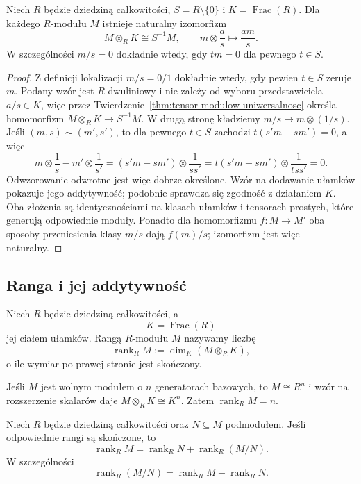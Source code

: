 \begin{stwierdzenie}
\label{prop:tensor-cialo-ulamkow}
Niech $R$ będzie dziedziną całkowitości,
$S=R\setminus\{0\}$ i $K=\operatorname{Frac}(R)$.
Dla każdego $R$-modułu $M$ istnieje naturalny izomorfizm
\[
M\otimes_R K\cong S^{-1}M,
\qquad m\otimes\frac{a}{s}\longmapsto\frac{am}{s}.
\]
W szczególności $m/s=0$ dokładnie wtedy, gdy
$tm=0$ dla pewnego $t\in S$.
\end{stwierdzenie}
\begin{proof}
Z definicji lokalizacji
$m/s=0/1$ dokładnie wtedy, gdy pewien $t\in S$
zeruje $m$. Podany wzór jest $R$-dwuliniowy i nie zależy
od wyboru przedstawiciela $a/s\in K$, więc przez
Twierdzenie~\ref{thm:tensor-modulow-uniwersalnosc}
określa homomorfizm $M\otimes_R K\to S^{-1}M$.
W drugą stronę kładziemy $m/s\mapsto m\otimes(1/s)$.
Jeśli $(m,s)\sim(m',s')$, to dla pewnego $t\in S$
zachodzi $t(s'm-sm')=0$, a więc
\[
m\otimes\frac1s-m'\otimes\frac1{s'}
=(s'm-sm')\otimes\frac1{ss'}
=t(s'm-sm')\otimes\frac1{tss'}=0.
\]
Odwzorowanie odwrotne jest więc dobrze określone.
Wzór na dodawanie ułamków pokazuje jego addytywność;
podobnie sprawdza się zgodność z działaniem $K$.
Oba złożenia są identycznościami na klasach ułamków
i tensorach prostych, które generują odpowiednie moduły.
Ponadto dla homomorfizmu $f:M\to M'$ oba sposoby
przeniesienia klasy $m/s$ dają $f(m)/s$;
izomorfizm jest więc naturalny.
\end{proof}

\subsection*{Ranga i jej addytywność}

\begin{definicja}
\label{def:ranga-modulu}
Niech $R$ będzie dziedziną całkowitości, a
\[
K=\operatorname{Frac}(R)
\]
jej ciałem ułamków. Rangą $R$-modułu $M$ nazywamy liczbę
\[
\operatorname{rank}_R M
:=
\dim_K(M\otimes_R K),
\]
o ile wymiar po prawej stronie jest skończony.
\end{definicja}

Jeśli $M$ jest wolnym modułem o $n$ generatorach bazowych, to
$M\cong R^n$ i wzór na rozszerzenie skalarów daje
$M\otimes_R K\cong K^n$. Zatem $\operatorname{rank}_R M=n$.

\begin{stwierdzenie}
\label{prop:ranga-ilorazu}
Niech $R$ będzie dziedziną całkowitości oraz
$N\subseteq M$ podmodułem. Jeśli odpowiednie rangi są skończone, to
\[
\operatorname{rank}_R M
=
\operatorname{rank}_R N
+
\operatorname{rank}_R(M/N).
\]
W szczególności
\[
\operatorname{rank}_R(M/N)
=
\operatorname{rank}_R M
-
\operatorname{rank}_R N.
\]
\end{stwierdzenie}

